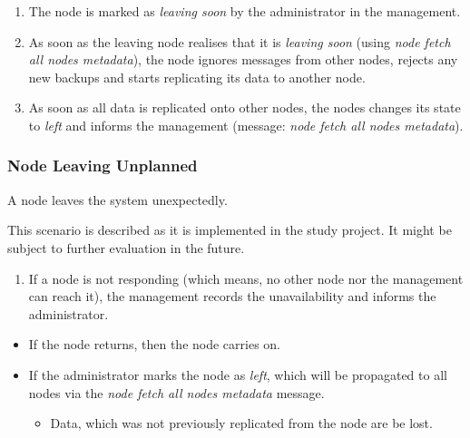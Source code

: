 \begin{enumerate}
    \item The node is marked as \emph{leaving soon} by the administrator in the management.
    \item As soon as the leaving node realises that it is \emph{leaving soon} (using \emph{node fetch all nodes metadata}), the node ignores messages from other nodes, rejects any new backups and starts replicating its data to another node.
    \item As soon as all data is replicated onto other nodes, the nodes changes its state to \emph{left} and informs the management (message: \emph{node fetch all nodes metadata}). %
\end{enumerate}

\subsubsection{Node Leaving Unplanned}\label{sec:scenario-node-leave-unplanned}
A node leaves the system unexpectedly.

This scenario is described as it is implemented in the study project. It might be subject to further evaluation in the future.

\begin{enumerate}
    \item If a node is not responding (which means, no other node nor the management can reach it), the management records the unavailability and informs the administrator.
\end{enumerate}

\begin{itemize}
    \item If the node returns, then the node carries on.
    \item If the administrator marks the node as \emph{left}, which will be propagated to all nodes via the \emph{node fetch all nodes metadata} message.
        \begin{itemize}
            \item Data, which was not previously replicated from the node are be lost.
        \end{itemize}
\end{itemize}

